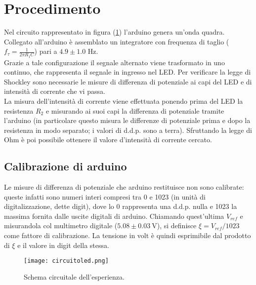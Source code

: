 \documentclass[11pt,a4paper]{article}
\begin{document}
\section{Procedimento}
	Nel circuito rappresentato in figura (\ref{fig:circuito}) l'arduino genera un'onda quadra. Collegato all'arduino \`{e} assemblato un integratore con frequenza di taglio ($f_\tau = \frac{1}{2\pi R_1 C}$) pari a $4.9\pm 1.0$ Hz.\\
	Grazie a tale configurazione il segnale alternato viene trasformato in uno continuo, che rappresenta il segnale in ingresso nel LED.
	Per verificare la legge di Shockley sono necessarie le misure di differenza di potenziale ai capi del LED e di intensit\`{a} di corrente che vi passa. \\
	La misura dell'intensit\`{a} di corrente viene effettuata ponendo prima del LED la resistenza $R_2$ e misurando ai suoi capi la differenza di potenziale tramite l'arduino (in particolare questo misura le differenze di potenziale prima e dopo la resistenza in modo separato; i valori di d.d.p. sono a terra). Sfruttando la legge di Ohm è poi possibile ottenere il valore d'intensità di corrente cercato.
	\subsection{Calibrazione di arduino}
		Le misure di differenza di potenziale che arduino restituisce non sono calibrate: queste infatti sono numeri interi compresi tra 0 e 1023 (in unit\`{a} di digitalizzazione, dette digit), dove lo 0 rappresenta una d.d.p. nulla e 1023 la massima fornita dalle uscite digitali di arduino.
		Chiamando quest'ultima $V_{ref}$ e misurandola col multimetro digitale ($5.08 \pm 0.03 \ $V), si definisce $\xi = {V_{ref}}/1023$ come fattore di calibrazione. La tensione in volt \`{e} quindi esprimibile dal prodotto di $\xi$ e il valore in digit della stessa.
		
		
	
\begin{figure}[h!]
	\centering
	\texttt{[image: circuitoled.png]}
	\caption{Schema circuitale dell'esperienza.}
	\label{fig:circuito}
\end{figure}

\newpage
\end{document}
